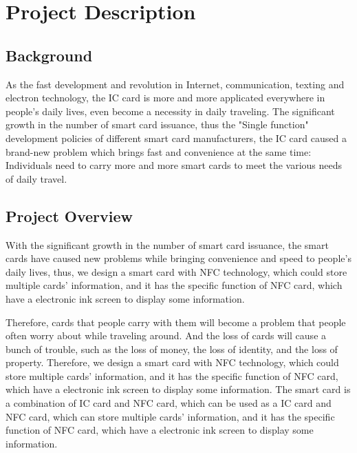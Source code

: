 \documentclass[11pt, a4paper]{article}
\begin{document}
\vspace{1cm}

\begin{center}

\tableofcontents

\end{center}

\newpage

\section{Project Description}

\subsection{Background}

As the fast development and revolution in Internet, communication, texting and electron technology, the IC card is more and more applicated everywhere in people's daily lives, even become a necessity in daily traveling.
The significant growth in the number of smart card issuance, thus the "Single function" development policies of different smart card manufacturers, the IC card caused a brand-new problem which brings fast and convenience at the same time: Individuals need to carry more and more smart cards to meet the various needs of daily travel.

\subsection{Project Overview}
With the significant growth in the number of smart card issuance, the smart cards have caused new problems while bringing convenience and speed to people's daily lives, thus, we design a smart card with NFC technology, which could store multiple cards' information, and it has the specific function of NFC card, which have a electronic ink screen to display some information.

Therefore, cards that people carry with them will become a problem that people often worry about while traveling around. And the loss of cards will cause a bunch of trouble, such as the loss of money, the loss of identity, and the loss of property. Therefore, we design a smart card with NFC technology, which could store multiple cards' information, and it has the specific function of NFC card, which have a electronic ink screen to display some information.
The smart card is a combination of IC card and NFC card, which can be used as a IC card and NFC card, which can store multiple cards' information, and it has the specific function of NFC card, which have a electronic ink screen to display some information.
\end{document}
